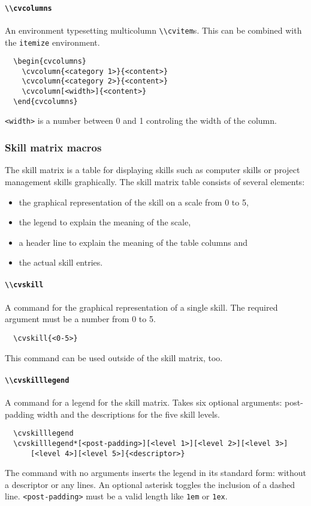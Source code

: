 \documentclass[a4paper, 11pt]{article}
\newcommand{\code}[1]{\lstinline!#1!}
\begin{document}
\paragraph{\code{\\cvcolumns}}
An environment typesetting multicolumn \code{\\cvitem}s.
This can be combined with the \code{itemize} environment.
\begin{lstlisting}
  \begin{cvcolumns}
    \cvcolumn{<category 1>}{<content>}
    \cvcolumn{<category 2>}{<content>}
    \cvcolumn[<width>]{<content>}
  \end{cvcolumns}
\end{lstlisting}
\code{<width>} is a number between 0 and 1 controling the width of the column.

\subsubsection{Skill matrix macros}
The skill matrix is a table for displaying skills such as computer skills or project management skills graphically.
The skill matrix table consists of several elements:
\begin{itemize}
  \item the graphical representation of the skill on a scale from 0 to 5,
  \item the legend to explain the meaning of the scale,
  \item a header line to explain the meaning of the table columns and
  \item the actual skill entries.
\end{itemize}

\paragraph{\code{\\cvskill}}
A command for the graphical representation of a single skill.
The required argument must be a number from 0 to 5.
\begin{lstlisting}
  \cvskill{<0-5>}
\end{lstlisting}
This command can be used outside of the skill matrix, too.

\paragraph{\code{\\cvskilllegend}}
A command for a legend for the skill matrix.
Takes six optional arguments: post-padding width and the descriptions for the five skill levels.
\begin{lstlisting}
  \cvskilllegend
  \cvskilllegend*[<post-padding>][<level 1>][<level 2>][<level 3>]
      [<level 4>][<level 5>]{<descriptor>}
\end{lstlisting}
The command with no arguments inserts the legend in its standard form: without a descriptor or any lines.
An optional asterisk toggles the inclusion of a dashed line.
\code{<post-padding>} must be a valid length like \code{1em} or \code{1ex}.
\end{document}
